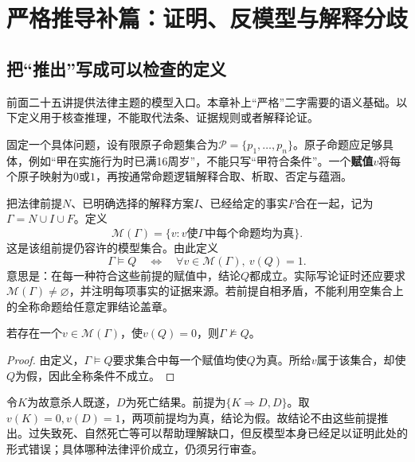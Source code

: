 \chapter{严格推导补篇：证明、反模型与解释分歧}

\section{把“推出”写成可以检查的定义}
前面二十五讲提供法律主题的模型入口。本章补上“严格”二字需要的语义基础。以下定义用于核查推理，不能取代法条、证据规则或者解释论证。

固定一个具体问题，设有限原子命题集合为$\mathcal P=\{p_1,\ldots,p_n\}$。原子命题应足够具体，例如“甲在实施行为时已满16周岁”，不能只写“甲符合条件”。一个\textbf{赋值}$v$将每个原子映射为$0$或$1$，再按通常命题逻辑解释合取、析取、否定与蕴涵。

把法律前提$N$、已明确选择的解释方案$I$、已经给定的事实$F$合在一起，记为$\Gamma=N\cup I\cup F$。定义
\[
 \mathcal M(\Gamma)=\{v:\text{$v$使$\Gamma$中每个命题均为真}\}.
\]
这是该组前提仍容许的模型集合。由此定义
\[
 \Gamma\models Q
 \quad\Longleftrightarrow\quad
 \forall v\in\mathcal M(\Gamma),\ v(Q)=1.
\]
意思是：在每一种符合这些前提的赋值中，结论$Q$都成立。实际写论证时还应要求$\mathcal M(\Gamma)\ne\varnothing$，并注明每项事实的证据来源。若前提自相矛盾，不能利用空集合上的全称命题给任意定罪结论盖章。

\begin{modelprop}[反模型足以否定逻辑蕴涵]
若存在一个$v\in\mathcal M(\Gamma)$，使$v(Q)=0$，则$\Gamma\not\models Q$。
\end{modelprop}
\begin{proof}
由定义，$\Gamma\models Q$要求集合中每一个赋值均使$Q$为真。所给$v$属于该集合，却使$Q$为假，因此全称条件不成立。
\end{proof}

令$K$为故意杀人既遂，$D$为死亡结果。前提为$\{K\Rightarrow D,D\}$。取$v(K)=0,v(D)=1$，两项前提均为真，结论为假。故结论不由这些前提推出。过失致死、自然死亡等可以帮助理解缺口，但反模型本身已经足以证明此处的形式错误；具体哪种法律评价成立，仍须另行审查。


